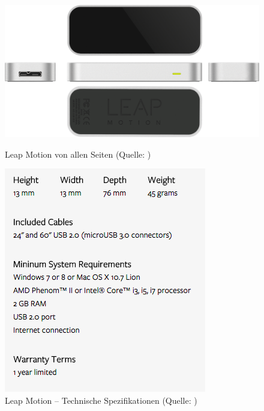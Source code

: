 \begin{figure}[H]
  \begin{minipage}[b]{0.45\linewidth}
    \centering
   	\includegraphics[width=1.0\linewidth]{images/analysis/leap_360_view.png}
   	\caption[Leap Motion von allen Seiten]{Leap Motion von allen Seiten (Quelle: )}
  \end{minipage}%
  \hspace{.1\linewidth}
  \begin{minipage}[b]{0.45\linewidth}
    \centering
	\includegraphics[width=1.0\linewidth]{images/analysis/leap_technical_specifiaction.png}
	\caption[Leap Motion -- Technische Spezifikationen]{Leap Motion -- Technische Spezifikationen (Quelle: )}
  \end{minipage}
\end{figure}

